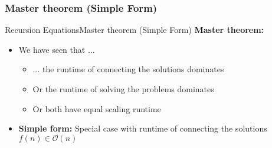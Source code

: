 
\subsubsection{Master theorem (Simple Form)}

\begin{frame}{Recursion Equations}{Master theorem (Simple Form)}
  \textbf{Master theorem:}
  \begin{itemize}
    \item
      We have seen that $\ldots$
      \begin{itemize}
        \item
          $\ldots$ the runtime of {\color{Mittel-Blau}connecting the solutions}
          dominates
        \item
          Or the runtime of {\color{Mittel-Blau}solving the problems} dominates
        \item
          Or both have {\color{Mittel-Blau}equal scaling runtime}
      \end{itemize}
    \item
      \textbf{Simple form:}
      Special case with runtime of connecting the solutions
      {\color{Mittel-Blau}$f(n) \in \mathcal{O}(n)$}
  \end{itemize}
\end{frame}


